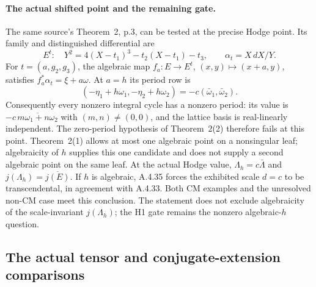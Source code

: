 \paragraph{The actual shifted point and the remaining gate.}
The same source's Theorem~2, p.3, can be tested at the precise Hodge
point. Its family and distinguished differential are
\[
 E^t:\quad Y^2=4(X-t_1)^3-t_2(X-t_1)-t_3,
 \qquad \alpha_t=X\,dX/Y.
\]
For $t=(a,g_2,g_3)$, the algebraic map
$f_a:E\to E^t$, $(x,y)\mapsto(x+a,y)$, satisfies
$f_a^*\alpha_t=\xi+a\omega$.
At $a=h$ its period row is
\[
 (-\eta_1+h\omega_1,-\eta_2+h\omega_2)
       =-c(\bar\omega_1,\bar\omega_2).
\]
Consequently every nonzero integral cycle has a nonzero period:
its value is $-c\,\overline{m\omega_1+n\omega_2}$ with
$(m,n)\ne(0,0)$, and the lattice basis is real-linearly independent.
The zero-period hypothesis of Theorem~2(2) therefore fails at this
point. Theorem~2(1) allows at most one algebraic point on a nonsingular
leaf; algebraicity of $h$ supplies this one candidate and does not
supply a second algebraic point on the same leaf.
At the actual Hodge value,
$\Lambda_h=c\bar\Lambda$ and $j(\Lambda_h)=\overline{j(E)}$.
If $h$ is algebraic, A.4.35 forces the exhibited scale $d=c$ to be
transcendental, in agreement with A.4.33. Both CM examples and the
unresolved non-CM case meet this conclusion. The statement does not
exclude algebraicity of the scale-invariant $j(\Lambda_h)$; the H1
gate remains the nonzero algebraic-$h$ question.


\subsection{The actual tensor and conjugate-extension comparisons}

